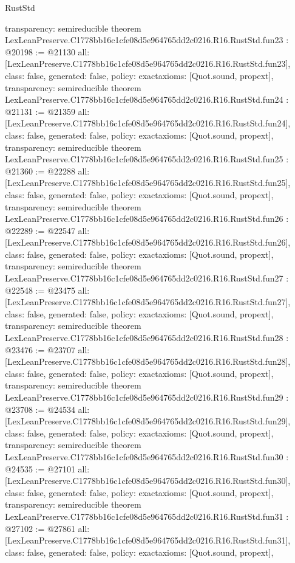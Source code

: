 \begin{lexlean}{RustStd}
\begin{coremodule}
{  transparency: semireducible
}
theorem LexLeanPreserve.C1778bb16c1cfe08d5e964765dd2c0216.R16.RustStd.fun23 : @20198 := @21130 {
  all: [LexLeanPreserve.C1778bb16c1cfe08d5e964765dd2c0216.R16.RustStd.fun23],
  class: false,
  generated: false,
  policy: exact{axioms: [Quot.sound, propext]},
  transparency: semireducible
}
theorem LexLeanPreserve.C1778bb16c1cfe08d5e964765dd2c0216.R16.RustStd.fun24 : @21131 := @21359 {
  all: [LexLeanPreserve.C1778bb16c1cfe08d5e964765dd2c0216.R16.RustStd.fun24],
  class: false,
  generated: false,
  policy: exact{axioms: [Quot.sound, propext]},
  transparency: semireducible
}
theorem LexLeanPreserve.C1778bb16c1cfe08d5e964765dd2c0216.R16.RustStd.fun25 : @21360 := @22288 {
  all: [LexLeanPreserve.C1778bb16c1cfe08d5e964765dd2c0216.R16.RustStd.fun25],
  class: false,
  generated: false,
  policy: exact{axioms: [Quot.sound, propext]},
  transparency: semireducible
}
theorem LexLeanPreserve.C1778bb16c1cfe08d5e964765dd2c0216.R16.RustStd.fun26 : @22289 := @22547 {
  all: [LexLeanPreserve.C1778bb16c1cfe08d5e964765dd2c0216.R16.RustStd.fun26],
  class: false,
  generated: false,
  policy: exact{axioms: [Quot.sound, propext]},
  transparency: semireducible
}
theorem LexLeanPreserve.C1778bb16c1cfe08d5e964765dd2c0216.R16.RustStd.fun27 : @22548 := @23475 {
  all: [LexLeanPreserve.C1778bb16c1cfe08d5e964765dd2c0216.R16.RustStd.fun27],
  class: false,
  generated: false,
  policy: exact{axioms: [Quot.sound, propext]},
  transparency: semireducible
}
theorem LexLeanPreserve.C1778bb16c1cfe08d5e964765dd2c0216.R16.RustStd.fun28 : @23476 := @23707 {
  all: [LexLeanPreserve.C1778bb16c1cfe08d5e964765dd2c0216.R16.RustStd.fun28],
  class: false,
  generated: false,
  policy: exact{axioms: [Quot.sound, propext]},
  transparency: semireducible
}
theorem LexLeanPreserve.C1778bb16c1cfe08d5e964765dd2c0216.R16.RustStd.fun29 : @23708 := @24534 {
  all: [LexLeanPreserve.C1778bb16c1cfe08d5e964765dd2c0216.R16.RustStd.fun29],
  class: false,
  generated: false,
  policy: exact{axioms: [Quot.sound, propext]},
  transparency: semireducible
}
theorem LexLeanPreserve.C1778bb16c1cfe08d5e964765dd2c0216.R16.RustStd.fun30 : @24535 := @27101 {
  all: [LexLeanPreserve.C1778bb16c1cfe08d5e964765dd2c0216.R16.RustStd.fun30],
  class: false,
  generated: false,
  policy: exact{axioms: [Quot.sound, propext]},
  transparency: semireducible
}
theorem LexLeanPreserve.C1778bb16c1cfe08d5e964765dd2c0216.R16.RustStd.fun31 : @27102 := @27861 {
  all: [LexLeanPreserve.C1778bb16c1cfe08d5e964765dd2c0216.R16.RustStd.fun31],
  class: false,
  generated: false,
  policy: exact{axioms: [Quot.sound, propext]},
}
\end{coremodule}
\end{lexlean}
